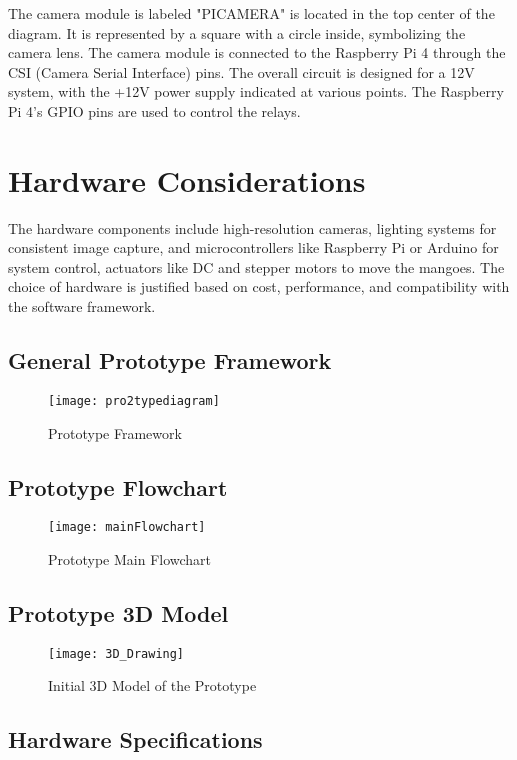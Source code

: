 The camera module is labeled "PICAMERA" is located in the top center of the
diagram. It is represented by a square with a circle inside, symbolizing the
camera lens. The camera module is connected to the Raspberry Pi 4 through the
CSI (Camera Serial Interface) pins. The overall circuit is designed for a 12V
system, with the +12V power supply indicated at various points. The Raspberry Pi
4's GPIO pins are used to control the relays.

\section{Hardware Considerations}
The hardware components include high-resolution cameras, lighting systems for consistent image capture, and 
microcontrollers like Raspberry Pi or Arduino for system control, actuators like DC and stepper motors to move 
the mangoes. The choice of hardware is justified based on cost, performance, and compatibility with the software framework.

\subsection{General Prototype Framework}
\begin{figure}[!htbp]
	\centering
	\texttt{[image: pro2typediagram]}
	\caption{Prototype Framework}
	\label{fig:prototypeDiagram_fig}
\end{figure}

\subsection{Prototype Flowchart}
\begin{figure}[!htbp]
	\centering
	\texttt{[image: mainFlowchart]}
	\caption{Prototype Main Flowchart}
	\label{fig:pro2typeDiagram_fig}
\end{figure}

\subsection{Prototype 3D Model}
\begin{figure}[!htbp]
	\centering
	\texttt{[image: 3D\_Drawing]}
	\caption{Initial 3D Model of the Prototype}
	\label{fig:3dModel_fig}
\end{figure}


\subsection{Hardware Specifications}

